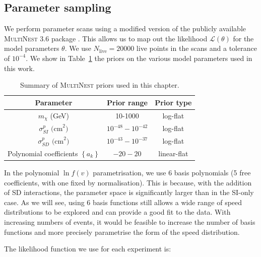 \subsection{Parameter sampling}
\label{sec:NT:sampling}
We perform parameter scans using a modified version of the publicly available \textsc{MultiNest 3.6} package \cite{Feroz:2007, Feroz:2008, Feroz:2014}. This allows us to map out the likelihood $\mathcal{L}(\theta)$ for the model parameters $\theta$.  We use $N_\textrm{live} = 20000$ live points in the scans and a tolerance of $10^{-4}$. We show in Table~\ref{tab:NT:priors} the priors on the various model parameters used in this work.

\begin{table}
  \setlength{\extrarowheight}{3pt}
  \begin{center}
	\begin{tabular}{ccc}
        \hline\hline
	Parameter & Prior range & Prior type \\
        \hline
        $m_\chi$ (GeV) & 10-1000 & log-flat \\
        $\sigma^p_{SI} \textrm{ (cm}^2\textrm{)}$ & $10^{-48} - 10^{-42}$ & log-flat \\
        $\sigma^p_{SD} \textrm{ (cm}^2\textrm{)}$ & $10^{-43} - 10^{-37}$ & log-flat \\
        Polynomial coefficients $\left\{a_k\right\}$ & $-20 - 20$ & linear-flat \\
        \hline\hline
        \end{tabular}
  \end{center}
\label{tab:NT:priors}
\caption[Summary of \textsc{MultiNest} priors used in Chapter~\ref{ch:NT}]{Summary of \textsc{MultiNest} priors used in this chapter.}
\end{table}

In the polynomial $\ln f(v)$ parametrisation, we use 6 basis polynomials (5 free coefficients, with one fixed by normalisation). This is because, with the addition of SD interactions, the parameter space is significantly larger than in the SI-only case. As we will see, using 6 basis functions still allows a wide range of speed distributions to be explored and can provide a good fit to the data. With increasing numbers of events, it would be feasible to increase the number of basis functions and more precisely parametrise the form of the speed distribution.

The likelihood function we use for each experiment is:

